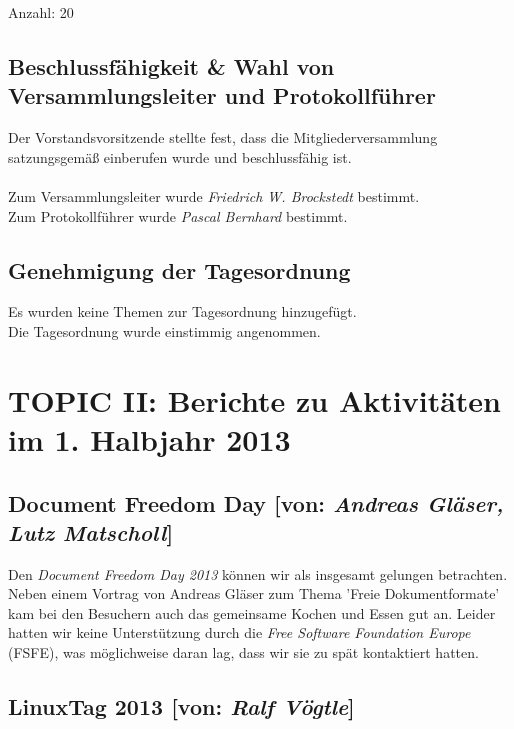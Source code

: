 \documentclass[11pt,a4paper,ngerman]{article}
\begin{document}
    Anzahl: 20

  \subsection{Beschlussfähigkeit \& Wahl von Versammlungsleiter und 
	      Protokollführer}

	      Der Vorstandsvorsitzende stellte fest, dass die 
	      Mitgliederversammlung satzungsgemäß einberufen wurde und 
	      beschlussfähig ist. \\
	      \\
	      Zum Versammlungsleiter wurde \emph{Friedrich W. Brockstedt} 
	      bestimmt. \\
	      Zum Protokollführer wurde \emph{Pascal Bernhard} bestimmt.



  \subsection{Genehmigung der Tagesordnung}

	      Es wurden keine Themen zur Tagesordnung hinzugefügt. \\
	      Die Tagesordnung wurde einstimmig angenommen.

\newpage{}	  
	
	
\section{TOPIC II: Berichte zu Aktivitäten im 1. Halbjahr 2013}

  
  \subsection{Document Freedom Day [von: 
              \textcolor{hellgrau.60}{\textsl{Andreas Gläser, Lutz Matscholl}}]}

              
Den \textsl{Document Freedom Day 2013} können wir als insgesamt 
gelungen betrachten. Neben einem Vortrag von Andreas Gläser zum Thema 'Freie 
Dokumentformate' kam bei den Besuchern auch das gemeinsame Kochen und Essen gut 
an. Leider hatten wir keine Unterstützung durch die \emph{Free Software 
Foundation Europe} (FSFE), was möglichweise daran lag, dass wir sie zu spät 
kontaktiert hatten.



  \subsection{LinuxTag 2013 [von: \textcolor{hellgrau.60}{\textsl{Ralf 
              Vögtle}}]}
	    
\end{document}
